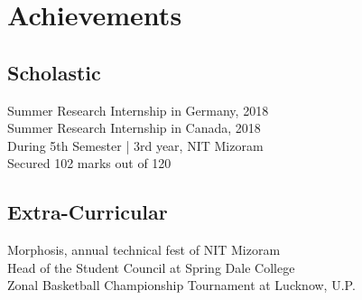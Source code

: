 
\section{Achievements} 
\subsection{Scholastic}
Summer Research Internship in Germany, 2018 \\
Summer Research Internship in Canada, 2018 \\
During 5th Semester | 3rd year, NIT Mizoram \\
Secured 102 marks out of 120 \\
\sectionsep

\subsection{Extra-Curricular}
Morphosis, annual technical fest of NIT Mizoram \\
Head of the Student Council at Spring Dale College \\
Zonal Basketball Championship Tournament at Lucknow, U.P. \\
\sectionsep